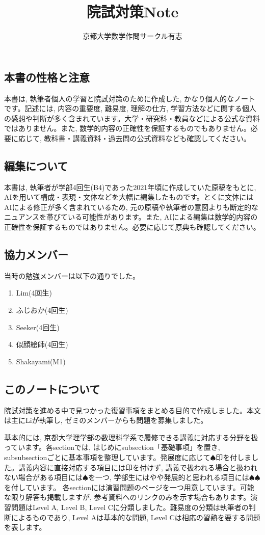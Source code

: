 \documentclass[twocolumn]{jbook}
\theoremstyle{definition}
\newcommand{\ben}{\begin{enumerate}}
\newcommand{\een}{\end{enumerate}}
\begin{document}
\begin{titlepage}
\title{院試対策Note}
\author{京都大学数学作問サークル有志}
\maketitle
\onecolumn
\thispagestyle{empty}
\end{titlepage}
\subsection*{本書の性格と注意}
本書は, 執筆者個人の学習と院試対策のために作成した, かなり個人的なノートです。記述には, 内容の重要度, 難易度, 理解の仕方, 学習方法などに関する個人の感想や判断が多く含まれています。大学・研究科・教員などによる公式な資料ではありません。また, 数学的内容の正確性を保証するものでもありません。必要に応じて, 教科書・講義資料・過去問の公式資料なども確認してください。

\subsection*{編集について}
本書は, 執筆者が学部4回生(B4)であった2021年頃に作成していた原稿をもとに, AIを用いて構成・表現・文体などを大幅に編集したものです。とくに文体にはAIによる修正が多く含まれているため, 元の原稿や執筆者の意図よりも断定的なニュアンスを帯びている可能性があります。また, AIによる編集は数学的内容の正確性を保証するものではありません。必要に応じて原典も確認してください。

\subsection{協力メンバー}
当時の勉強メンバーは以下の通りでした。
\ben
\item Lim(4回生)
\item ふじおか(4回生)
\item Seeker(4回生)
\item 似顔絵師(4回生)
\item Shakayami(M1)
\een


\subsection{このノートについて}
院試対策を進める中で見つかった復習事項をまとめる目的で作成しました。本文は主にLiが執筆し, ゼミのメンバーからも問題を募集しました。

基本的には, 京都大学理学部の数理科学系で履修できる講義に対応する分野を扱っています。各sectionでは, はじめにsubsection「基礎事項」を置き, subsubsectionごとに基本事項を整理しています。発展度に応じて$\spadesuit$印を付しました。講義内容に直接対応する項目には印を付けず, 講義で扱われる場合と扱われない場合がある項目には$\spadesuit$を一つ, 学部生にはやや発展的と思われる項目には$\spadesuit\spadesuit$を付しています。
各sectionには演習問題のページを一つ用意しています。可能な限り解答も掲載しますが, 参考資料へのリンクのみを示す場合もあります。演習問題はLevel A, Level B, Level Cに分類しました。難易度の分類は執筆者の判断によるものであり, Level Aは基本的な問題, Level Cは相応の習熟を要する問題を表します。
\end{document}
